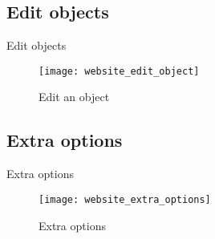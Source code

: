 \subsection{Edit objects}

Edit objects
\begin{figure}[H]
    \centering
    \texttt{[image: website\_edit\_object]}
    \caption{Edit an object}
    \label{fig:website_edit_object}
\end{figure}

\subsection{Extra options}
Extra options

\begin{figure}[H]
    \centering
    \texttt{[image: website\_extra\_options]}
    \caption{Extra options}
    \label{fig:website_extra_options}
\end{figure}
